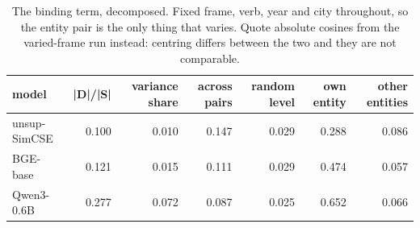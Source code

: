\begin{table}[t]
\centering
\small
\caption{The binding term, decomposed. Fixed frame, verb, year and city throughout, so the entity pair is the only thing that varies. Quote absolute cosines from the varied-frame run instead: centring differs between the two and they are not comparable.}
\begin{tabular}{lrrrrrr}
\toprule
model & |D|/|S| & variance share & across pairs & random level & own entity & other entities \\
\midrule
unsup-SimCSE & 0.100 & 0.010 & 0.147 & 0.029 & 0.288 & 0.086 \\
BGE-base & 0.121 & 0.015 & 0.111 & 0.029 & 0.474 & 0.057 \\
Qwen3-0.6B & 0.277 & 0.072 & 0.087 & 0.025 & 0.652 & 0.066 \\
\bottomrule
\end{tabular}
\end{table}
